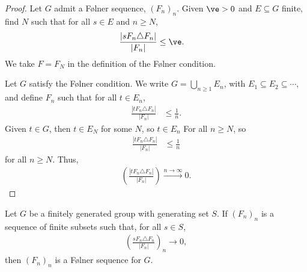 \begin{proof}
  Let $G$ admit a Følner sequence, $\left(F_n\right)_n$. Given $\ve > 0$ and $E\subseteq G$ finite, find $N$ such that for all $s\in E$ and $n\geq N$,
  \begin{align*}
    \frac{\left\vert sF_n\triangle F_n \right\vert}{\left\vert F_n \right\vert} &\leq \ve.
  \end{align*}
  We take $F = F_N$ in the definition of the Følner condition.\newline

  Let $G$ satisfy the Følner condition. We write $G = \bigcup_{n\geq 1}E_n$, with $E_1\subseteq E_2\subseteq \cdots$, and define $F_n$ such that for all $t\in E_n$,
  \begin{align*}
    \frac{\left\vert tF_n\triangle F_n \right\vert}{\left\vert F_n \right\vert} &\leq \frac{1}{n}.
  \end{align*}
  Given $t\in G$, then $t\in E_N$ for some $N$, so $t\in E_n$ For all $n\geq N$, so
  \begin{align*}
    \frac{\left\vert tF_n\triangle F_n \right\vert}{\left\vert F_n \right\vert} &\leq \frac{1}{n}
  \end{align*}
  for all $n\geq N$. Thus,
  \begin{align*}
    \left(\frac{\left\vert tF_n\triangle F_n \right\vert}{\left\vert F_n \right\vert}\right)\xrightarrow{n\rightarrow\infty}0.
  \end{align*}
\end{proof}
\begin{lemma}
  Let $G$ be a finitely generated group with generating set $S$. If $\left(F_n\right)_n$ is a sequence of finite subsets such that, for all $s\in S$,
  \begin{align*}
    \left(\frac{sF_n\triangle F_n}{\left\vert F_n \right\vert}\right)_n\rightarrow 0,
  \end{align*}
  then $\left(F_n\right)_n$ is a Følner sequence for $G$.
\end{lemma}
